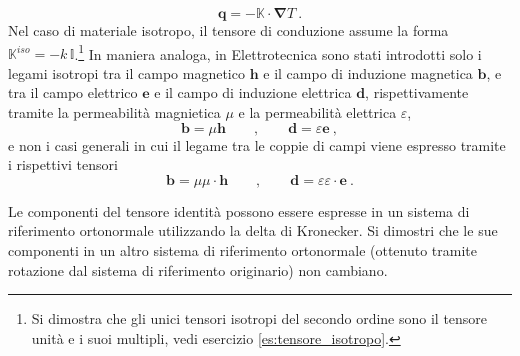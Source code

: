  \begin{equation}
     \bm{q} = - \mathbb{K} \cdot \bm{\nabla} T \ .
 \end{equation}
Nel caso di materiale isotropo, il tensore di conduzione assume la forma $\mathbb{K}^{iso} = -k \, \mathbb{I}$.\footnote{Si dimostra che gli unici tensori isotropi del secondo ordine sono il tensore unità e i suoi multipli, vedi esercizio \ref{es:tensore_isotropo}.}
In maniera analoga, in Elettrotecnica sono stati introdotti solo i legami isotropi tra il campo magnetico $\bm{h}$ e il campo di induzione magnetica $\bm{b}$, e tra il campo elettrico $\bm{e}$ e il campo di induzione elettrica $\bm{d}$, rispettivamente tramite la permeabilità magnietica $\mu$ e la permeabilità elettrica $\varepsilon$,
\begin{equation}
  \bm{b} = \mu \bm{h} \qquad , \qquad  \bm{d} = \varepsilon \bm{e} \ , 
\end{equation}
e non i casi generali in cui il legame tra le coppie di campi viene espresso tramite i rispettivi tensori
\begin{equation}
  \bm{b} = \mu\!\!\!\mu \cdot \bm{h} \qquad , \qquad  \bm{d} = \varepsilon\!\!\varepsilon \cdot \bm{e} \ . 
\end{equation}

\begin{exercise}\label{es:tensore_isotropo}
    Le componenti del tensore identità possono essere espresse in un sistema di riferimento ortonormale utilizzando la delta di Kronecker. Si dimostri che le sue componenti in un altro sistema di riferimento ortonormale (ottenuto tramite rotazione dal sistema di riferimento originario) non cambiano.
\end{exercise}


